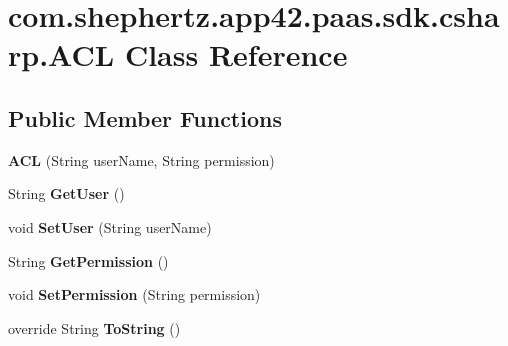 \hypertarget{classcom_1_1shephertz_1_1app42_1_1paas_1_1sdk_1_1csharp_1_1_a_c_l}{\section{com.\+shephertz.\+app42.\+paas.\+sdk.\+csharp.\+A\+C\+L Class Reference}
\label{classcom_1_1shephertz_1_1app42_1_1paas_1_1sdk_1_1csharp_1_1_a_c_l}
}
\subsection*{Public Member Functions}
\begin{DoxyCompactItemize}
\item 
\hypertarget{classcom_1_1shephertz_1_1app42_1_1paas_1_1sdk_1_1csharp_1_1_a_c_l_a956984c6994be620649b2bc4d49423d4}{{\bfseries A\+C\+L} (String user\+Name, String permission)}\label{classcom_1_1shephertz_1_1app42_1_1paas_1_1sdk_1_1csharp_1_1_a_c_l_a956984c6994be620649b2bc4d49423d4}

\item 
\hypertarget{classcom_1_1shephertz_1_1app42_1_1paas_1_1sdk_1_1csharp_1_1_a_c_l_a8941b0e49eb18d26b215c4f450920e14}{String {\bfseries Get\+User} ()}\label{classcom_1_1shephertz_1_1app42_1_1paas_1_1sdk_1_1csharp_1_1_a_c_l_a8941b0e49eb18d26b215c4f450920e14}

\item 
\hypertarget{classcom_1_1shephertz_1_1app42_1_1paas_1_1sdk_1_1csharp_1_1_a_c_l_aeaeee9b6ead9b1daf30948b92b97c70d}{void {\bfseries Set\+User} (String user\+Name)}\label{classcom_1_1shephertz_1_1app42_1_1paas_1_1sdk_1_1csharp_1_1_a_c_l_aeaeee9b6ead9b1daf30948b92b97c70d}

\item 
\hypertarget{classcom_1_1shephertz_1_1app42_1_1paas_1_1sdk_1_1csharp_1_1_a_c_l_a9103c0c65379a37b51999775dce0ca16}{String {\bfseries Get\+Permission} ()}\label{classcom_1_1shephertz_1_1app42_1_1paas_1_1sdk_1_1csharp_1_1_a_c_l_a9103c0c65379a37b51999775dce0ca16}

\item 
\hypertarget{classcom_1_1shephertz_1_1app42_1_1paas_1_1sdk_1_1csharp_1_1_a_c_l_a3a773f8b1aa8c853628fa1d81affc87e}{void {\bfseries Set\+Permission} (String permission)}\label{classcom_1_1shephertz_1_1app42_1_1paas_1_1sdk_1_1csharp_1_1_a_c_l_a3a773f8b1aa8c853628fa1d81affc87e}

\item 
\hypertarget{classcom_1_1shephertz_1_1app42_1_1paas_1_1sdk_1_1csharp_1_1_a_c_l_a2af97d53c6b0b263662b0416d7b94b7d}{override String {\bfseries To\+String} ()}\label{classcom_1_1shephertz_1_1app42_1_1paas_1_1sdk_1_1csharp_1_1_a_c_l_a2af97d53c6b0b263662b0416d7b94b7d}


\end{DoxyCompactItemize}
